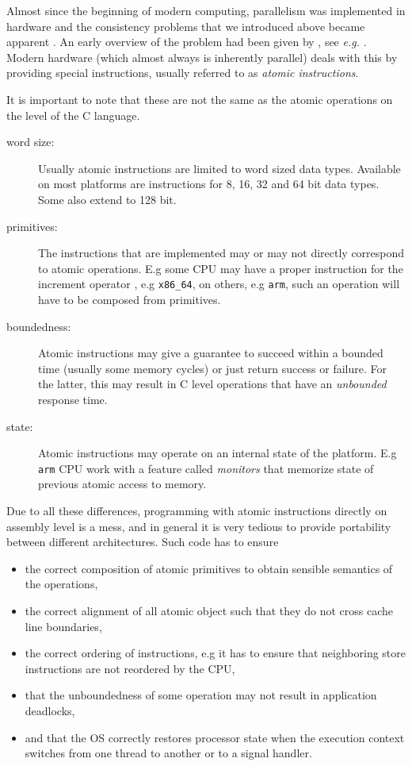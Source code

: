 Almost since the beginning of modern computing, parallelism was
implemented in hardware and the consistency problems that we
introduced above became apparent
\iflong
.
An early overview of the problem had been given by
\else
,
see \textsl{e.g.}
\fi
\cite{Netzer1992}.
Modern hardware (which almost
always is inherently parallel) deals with this by providing special
instructions, usually referred to as \emph{atomic instructions}.

\iflong%
It is important to note that these are not the same as the atomic
operations on the level of the C language.\itemadjust

\begin{description}
\item[{word size:}] Usually atomic instructions are limited to word
sized data types. Available on most platforms are
instructions for 8, 16, 32 and 64 bit
data types. Some also extend to 128 bit.\itemadjust
\item[{primitives:}] The instructions that are implemented may or may
not directly correspond to atomic operations. E.g
some CPU may have a proper instruction for the
increment operator \code{++}, e.g \texttt{x86\_64}, on others,
e.g \texttt{arm}, such an operation will have to be
composed from primitives.\itemadjust
\item[{boundedness:}] Atomic instructions may give a guarantee to
succeed within a bounded time (usually some
memory cycles) or just return success or
failure. For the latter, this may result in C
level operations that have an \emph{unbounded}
response time.\itemadjust
\item[{state:}] Atomic instructions may operate on an internal state of
the platform. E.g \texttt{arm} CPU work with a feature called
\emph{monitors} that memorize state of previous atomic
access to memory.\itemadjust
\end{description}

Due to all these differences, programming with atomic instructions
directly on assembly level is a mess, and in general it is very
tedious to provide portability between different
architectures. Such code has to ensure\itemadjust
\begin{itemize}
\item the correct composition of atomic primitives to obtain sensible
semantics of the operations,\itemadjust
\item the correct alignment of all atomic object such that they do not
cross cache line boundaries,\itemadjust
\item the correct ordering of instructions, e.g it has to ensure that
neighboring store instructions are not reordered by the CPU,
\itemadjust
\item that the unboundedness of some operation may not result in
application deadlocks,\itemadjust
\item and that the OS correctly restores processor state when the
execution context switches from one thread to another or to a
signal handler.
\end{itemize}

